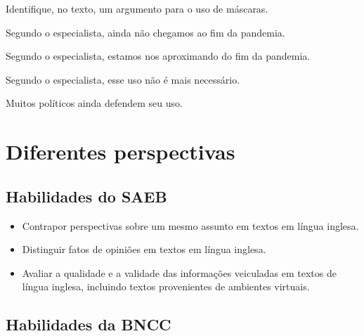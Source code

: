 Identifique, no texto, um argumento para o uso de máscaras.

\begin{escolha}
\item Segundo o especialista, ainda não chegamos ao fim da pandemia.

\item Segundo o especialista, estamos nos aproximando do fim da pandemia.

\item Segundo o especialista, esse uso não é mais necessário.

\item Muitos políticos ainda defendem seu uso.
\end{escolha}


\chapter{Diferentes perspectivas}


\section{Habilidades do SAEB}

\begin{itemize}
\item Contrapor perspectivas sobre um mesmo assunto em textos em língua
inglesa.

\item Distinguir fatos de opiniões em textos em língua inglesa.

\item Avaliar a qualidade e a validade das informações veiculadas em textos
de língua inglesa, incluindo textos provenientes de ambientes virtuais.
\end{itemize}

\section{Habilidades da BNCC}

